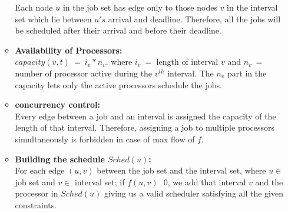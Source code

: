 \documentclass[pdftex,a4paper,12pt]{report}
\begin{document}
\begin{itemize}
\begin{itemize}
Each node $u$ in the job set has edge only to those nodes $v$ in the interval set which lie between $u's$ arrival and deadline. Therefore, all the jobs will be scheduled after their arrival and before their deadline.
\item \textbf{Availability of Processors:}\\
$capacity(v,t)\ =\ i_v*n_v$. where $i_v\ =$ length of interval $v$ and $n_v\ =$ number of processor active during the $v^{th}$ interval. The $n_v$ part in the capacity lets only the active processors schedule the jobs.
\item \textbf{concurrency control:}\\
Every edge between a job and an interval is assigned the capacity of the length of that interval. Therefore, assigning a job to multiple processors simultaneously is forbidden in case of max flow of $f$.
\item \textbf{Building the schedule $Sched(u)$:}\\
For each edge $(u,v)$ between the job set and the interval set,
where $u \in$ job set and $v \in$ interval set; if $f(u,v)\ \>\ 0$, we add that interval $v$ and the processor in $Sched(u)$ giving us a valid scheduler satisfying all the given constraints.
\end{itemize}
\end{itemize}
\end{document}
